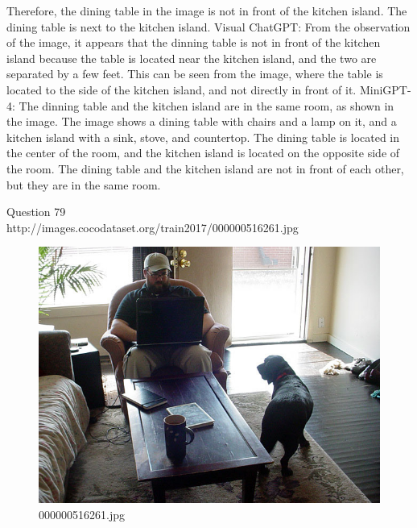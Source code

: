 \begin{enumerate}
    Therefore, the dining table in the image is not in front of the kitchen island. The dining table is next to the kitchen island.
    \subitem Visual ChatGPT: From the observation of the image, it appears that the dinning table is not in front of the kitchen island because the table is located near the kitchen island, and the two are separated by a few feet. This can be seen from the image, where the table is located to the side of the kitchen island, and not directly in front of it.
    \subitem MiniGPT-4: The dinning table and the kitchen island are in the same room, as shown in the image. The image shows a dining table with chairs and a lamp on it, and a kitchen island with a sink, stove, and countertop. The dining table is located in the center of the room, and the kitchen island is located on the opposite side of the room. The dining table and the kitchen island are not in front of each other, but they are in the same room.
\end{enumerate}
Question 79\\
http://images.cocodataset.org/train2017/000000516261.jpg
\begin{figure}[h]
    \centering
    \includegraphics[width=0.8\linewidth]{../image set/hard/000000516261.jpg}
    \caption{000000516261.jpg}
\end{figure}

